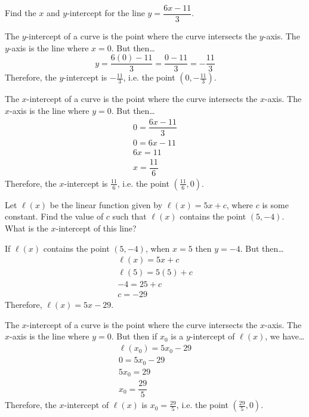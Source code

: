 \documentclass[11pt,letterpaper]{article}
\begin{document}
\newpage

 

 Find the $x$ and $y$-intercept for the line $y= \dfrac{6x - 11}{3}$. \pspace

\sol The $y$-intercept of a curve is the point where the curve intersects the $y$-axis. The $y$-axis is the line where $x= 0$. But then\dots
	\[
	y= \dfrac{6(0) - 11}{3}= \dfrac{0 - 11}{3}= -\dfrac{11}{3}
	\]
Therefore, the $y$-intercept is $-\frac{11}{3}$, i.e. the point $\left(0, -\frac{11}{3} \right)$. \pspace

The $x$-intercept of a curve is the point where the curve intersects the $x$-axis. The $x$-axis is the line where $y= 0$. But then\dots
	\[
	\begin{gathered}
	0= \dfrac{6x - 11}{3} \\[0.3cm]
	0= 6x - 11\\[0.3cm]
	6x= 11 \\[0.3cm]
	x= \dfrac{11}{6}
	\end{gathered}
	\] \pspace
Therefore, the $x$-intercept is $\frac{11}{6}$, i.e. the point $\left( \frac{11}{6}, 0 \right)$. 



\newpage



 Let $\ell(x)$ be the linear function given by $\ell(x)= 5x + c$, where $c$ is some constant. Find the value of $c$ such that $\ell(x)$ contains the point $(5, -4)$. What is the $x$-intercept of this line? \pspace

\sol If $\ell(x)$ contains the point $(5, -4)$, when $x= 5$ then $y= -4$. But then\dots
	\[
	\begin{gathered}
	\ell(x)= 5x + c \\[0.3cm]
	\ell(5)= 5(5) + c \\[0.3cm]
	-4= 25 + c \\[0.3cm]
	c= -29
	\end{gathered}
	\]
Therefore, $\ell(x)= 5x - 29$. \pspace

The $x$-intercept of a curve is the point where the curve intersects the $x$-axis. The $x$-axis is the line where $y= 0$. But then if $x_0$ is a $y$-intercept of $\ell(x)$, we have\dots
	\[
	\begin{gathered}
	\ell(x_0)= 5x_0 - 29 \\[0.3cm]
	0= 5x_0 - 29 \\[0.3cm]
	5x_0= 29 \\[0.3cm]
	x_0= \dfrac{29}{5}
	\end{gathered}
	\]
Therefore, the $x$-intercept of $\ell(x)$ is $x_0= \frac{29}{5}$, i.e. the point $\left( \frac{29}{5}, 0 \right)$. 
\end{document}
